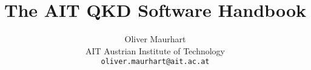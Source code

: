 \documentclass[a4paper,10pt]{book}
\begin{document}
\title{The AIT QKD Software Handbook}
\author{Oliver Maurhart\\
AIT Austrian Institute of Technology\\
\texttt{oliver.maurhart@ait.ac.at}}

\maketitle

\tableofcontents


















\end{document}
